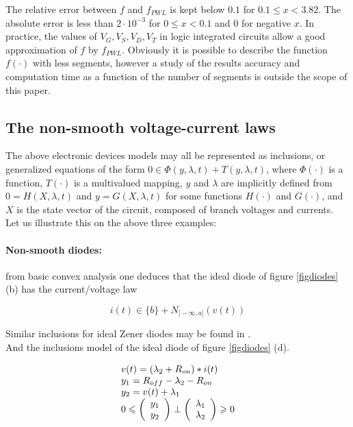 \documentclass{article}
\def\geq{\geqslant}
\def\leq{\leqslant}
\begin{document}
The relative error between $f$ and $f_{PWL}$ is kept below $0.1$ for $0.1 \leq x < 3.82$. The absolute error is less than $2 \cdot 10^{-3}$ for $0 \leq x < 0.1$ and $0$ for negative $x$. In practice, the values of $V_G,V_S,V_D,V_T$ in logic integrated circuits allow  a good approximation of $f$ by $f_{PWL}$. Obviously it is possible to describe the function $f(\cdot)$ with less segments, however a study of the results accuracy and computation time as a function of the number of segments is outside the scope of this paper. 


\subsection{The non-smooth voltage-current laws} 


The above electronic devices models may all be represented as inclusions, or generalized equations of the form $0 \in \Phi(y,\lambda,t) + T(y,\lambda,t)$, where $\Phi(\cdot)$ is a function, $T(\cdot)$ is a multivalued mapping, $y$ and $\lambda$ are implicitly defined from $0=H(X,\lambda,t)$ and $y=G(X,\lambda,t)$ for some functions $H(\cdot)$ and $G(\cdot)$, and $X$ is the state vector of the circuit, composed of branch voltages and currents. Let us illustrate this on the above three examples: 


\paragraph{Non-smooth  diodes:} from basic convex analysis one deduces that the ideal diode of figure \ref{figdiodes} (b) has the current/voltage law 

\begin{equation}
i(t) \in \{b\}+N_{]-\infty,a]}(v(t))
\end{equation} 

Similar inclusions for ideal Zener diodes may be found in \cite{acary-brogliato2008,addi2009}. \\

And the inclusions model of the ideal diode of figure \ref{figdiodes} (d).

\begin{equation}
  \label{eq:63diode}
  \begin{array}[l]{l}
    v(t)=(\lambda_2+R_{on})*i(t) \\
    y_1=R_{off}-\lambda_2-R_{on}\\
    y_2=v(t)+\lambda_1\\
    0 \leq \left(\begin{array}{c}
y_1\\
y_2
  \end{array}\right) \perp \left(\begin{array}{c}
\lambda_1\\
\lambda_2
  \end{array}\right) \geq 0
\end{array}
\end{equation}
\end{document}
